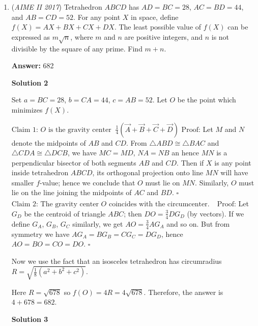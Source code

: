 \begin{enumerate}
	\item (\textit{AIME II 2017}) Tetrahedron $ABCD$ has $AD=BC=28$, $AC=BD=44$, and $AB=CD=52$. For any point $X$ in space, define $f(X)=AX+BX+CX+DX$. The least possible value of $f(X)$ can be expressed as $m\sqrt{n}$, where $m$ and $n$ are positive integers, and $n$ is not divisible by the square of any prime. Find $m+n$.


 
 \textbf{Answer: }682



\textbf{Solution 2}

Set $a=BC=28$, $b=CA=44$, $c=AB=52$. Let $O$ be the point which minimizes $f(X)$.

 $\boxed{\textrm{Claim 1: } O \textrm{ is the gravity center } \ \frac {1}{4}(\vec A + \vec B + \vec C + \vec D)}$
$\textrm{Proof:}$ Let $M$ and $N$ denote the midpoints of $AB$ and $CD$. From $\triangle ABD \cong \triangle BAC$ and $\triangle CDA \cong \triangle DCB$, we have  $MC=MD$, $NA=NB$ an hence $MN$ is a perpendicular bisector of both segments $AB$ and $CD$. Then if $X$ is any point inside tetrahedron $ABCD$, its orthogonal projection onto line $MN$ will have smaller $f$-value; hence we conclude that $O$ must lie on $MN$. Similarly, $O$ must lie on the line joining the midpoints of $AC$ and $BD$. $\square$
$\boxed{\textrm{Claim 2: The gravity center } O \textrm{ coincides with the circumcenter.} \phantom{\vec A}}$
$\textrm{Proof:}$  Let $G_D$ be the centroid of triangle $ABC$; then $DO = \frac 34 DG_D$ (by vectors). If we define $G_A$, $G_B$, $G_C$ similarly, we get $AO = \frac 34 AG_A$ and so on. But from symmetry we have $AG_A = BG_B = CG_C = DG_D$, hence $AO = BO = CO = DO$. $\square$

 Now we use the fact that an isosceles tetrahedron has circumradius $R = \sqrt{\frac18(a^2+b^2+c^2)}$. 

 Here $R = \sqrt{678}$ so $f(O) = 4R = 4\sqrt{678}$. Therefore, the answer is $4 + 678 = \boxed{682}$.

 



\textbf{Solution 3}



\end{enumerate}
